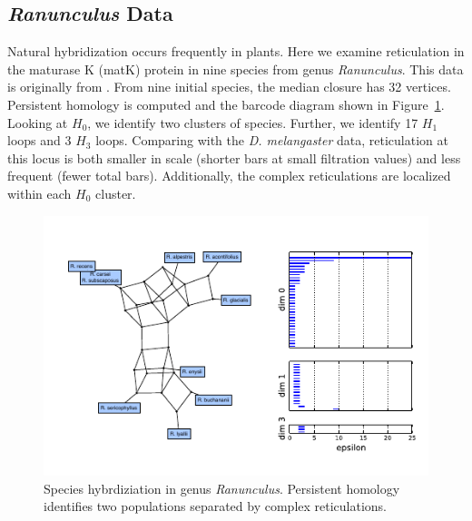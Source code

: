 \subsection{{\textit{Ranunculus}} Data}

Natural hybridization occurs frequently in plants.
Here we examine reticulation in the maturase K (matK) protein in nine species from genus \emph{Ranunculus}.
This data is originally from \cite{Huber:2001vv}.
From nine initial species, the median closure has 32 vertices.
Persistent homology is computed and the barcode diagram shown in Figure~\ref{fig:buttercup}.
Looking at $H_0$, we identify two clusters of species.
Further, we identify 17 $H_1$ loops and 3 $H_3$ loops.
Comparing with the \emph{D. melangaster} data, reticulation at this locus is both smaller in scale (shorter bars at small filtration values) and less frequent (fewer total bars).
Additionally, the complex reticulations are localized within each $H_0$ cluster.

\begin{figure}
\centering
\includegraphics[width=\columnwidth]{fig/complex_construction/buttercup.pdf}
\caption[Species hybrdiziation in genus \emph{Ranunculus}]{Species hybrdiziation in genus \emph{Ranunculus}. Persistent homology identifies two populations separated by complex reticulations.}
\label{fig:buttercup}
\end{figure}


